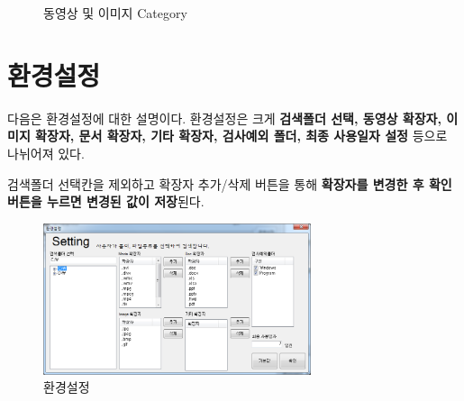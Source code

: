 \documentclass[a4paper, 13pt]{article} %
\begin{document}
	\begin{figure} [h]
	\centering
	\centering
	
	\caption{동영상 및 이미지 Category}
	\label{fig:avi}
	\label{fig:jpg}
	\end{figure}

	\newpage

	\section{환경설정}
	다음은 환경설정에 대한 설명이다.	환경설정은 크게 \textbf{검색폴더 선택, 동영상 확장자, 이미지 확장자, 문서 확장자, 기타 확장자, 검사예외 폴더, 최종 사용일자 설정} 등으로 나뉘어져 있다.
	
	검색폴더 선택칸을 제외하고 확장자 추가/삭제 버튼을 통해 \textbf{확장자를 변경한 후 확인 버튼을 누르면 변경된 값이 저장}된다.
	
	\begin{figure}[h]
		\centering
		\includegraphics[width=0.7\textwidth]{Figures/Setting}
		\caption{환경설정}
		\label{fig:setting}
	\end{figure}
\end{document}
